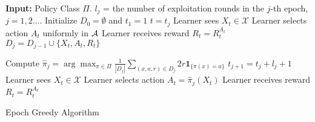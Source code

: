 \documentclass[11pt]{article}
\begin{document}
\begin{algorithm}
	\begin{algorithmic}[1]
		\STATE \textbf{Input:} Policy Class $\Pi$. $l_j$ = the number of exploitation rounds in the $j$-th epoch, $j = 1, 2 \dots.$
		\STATE Initialize $D_0 = \emptyset$ and $t_1 = 1$
		\STATE $t = t_j$
		\STATE Learner sees $X_t \in \mathcal{X}$
		\STATE Learner selects action $A_t$ uniformly in $\mathcal{A}$
		\STATE Learner receives reward $R_t = R^{A_t}_t$
		\STATE $D_j = D_{j-1} \cup \{ X_t, A_t, R_t  \}$
		
		\STATE  Compute $\hat \pi_j = \arg \max_{\pi \in \Pi} \frac{1}{|D_j|} \sum_{(x, a, r) \in D_j} 2 r \mathbf{1}_{\{\pi(x) = a\}}$
		\STATE $t_{j+1} = t_j + l_j + 1$
		\STATE Learner sees $X_t \in \mathcal{X}$
		\STATE Learner selects action $A_t = \hat \pi_j(X_t)$
		\STATE Learner receives reward $R_t = R^{A_t}_t$
		\ENDFOR
		\ENDFOR
		
	\end{algorithmic} 
	\caption{Epoch Greedy Algorithm}
	\label{EpochGreedyAlg}
\end{algorithm}
\end{document}
